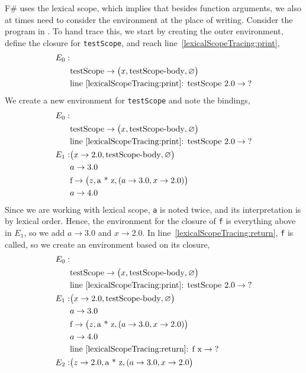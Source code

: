 F\# uses the lexical scope, which implies that besides function arguments, we also at times need to consider the environment at the place of writing. Consider the program in .
%
%
To hand trace this, we start by creating the outer environment, define the closure for \lstinline!testScope!, and reach line~\ref{lexicalScopeTracing:print},
\begin{align*}
  E_0:&\\
      &\text{testScope} \rightarrow \big(x, \text{testScope-body}, \varnothing\big)\\
      & \text{line~\ref{lexicalScopeTracing:print}: testScope 2.0} \rightarrow \text{?}\\
\end{align*}
We create a new environment for \lstinline!testScope! and note the bindings,
\begin{align*}
  E_0:&\\
      &\text{testScope} \rightarrow \big(x, \text{testScope-body}, \varnothing\big)\\
      & \text{line~\ref{lexicalScopeTracing:print}: testScope 2.0} \rightarrow \text{?}\\
  E_1: & \big(x\rightarrow 2.0, \text{testScope-body}, \varnothing\big)\\
      & a \rightarrow 3.0\\
      & \text{f} \rightarrow \big(z, \text{a * z}, (a \rightarrow 3.0, x\rightarrow 2.0)\big)\\
      & a \rightarrow 4.0
\end{align*}
Since we are working with lexical scope, \lstinline!a! is noted twice, and its interpretation is by lexical order. Hence, the environment for the closure of \lstinline!f! is everything above in $E_1$, so we add $a \rightarrow 3.0$ and $x \rightarrow 2.0$. In line~\ref{lexicalScopeTracing:return}, \lstinline!f! is called, so we create an environment based on its closure,
\begin{align*}
  E_0:&\\
      &\text{testScope} \rightarrow \big(x, \text{testScope-body}, \varnothing\big)\\
      & \text{line~\ref{lexicalScopeTracing:print}: testScope 2.0} \rightarrow \text{?}\\
  E_1: & \big(x\rightarrow 2.0, \text{testScope-body}, \varnothing\big)\\
      & a \rightarrow 3.0\\
      & \text{f} \rightarrow \big(z, \text{a * z}, (a \rightarrow 3.0, x\rightarrow 2.0)\big)\\
      & a \rightarrow 4.0 \\
      & \text{line~\ref{lexicalScopeTracing:return}: f x} \rightarrow \text{?}\\
  E_2: & \big(z \rightarrow 2.0, \text{a * z}, (a \rightarrow 3.0, x\rightarrow 2.0\big)\\
\end{align*}

